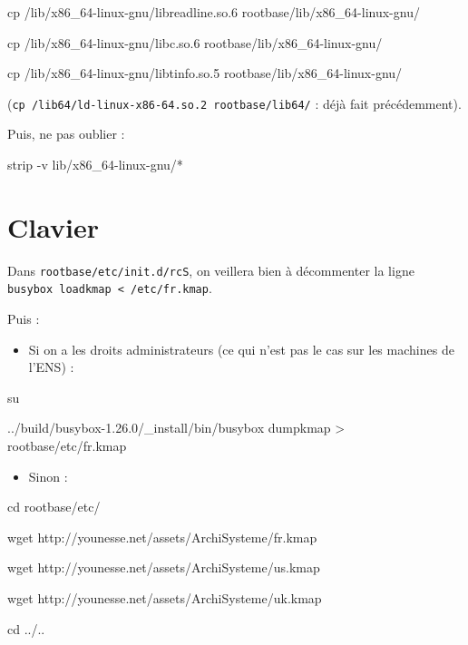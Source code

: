 \documentclass[]{article}
\newenvironment{Shaded}{}{}
\newcommand{\FunctionTok}[1]{\textcolor[rgb]{0.02,0.16,0.49}{{#1}}}
\newcommand{\OperatorTok}[1]{\textcolor[rgb]{0.40,0.40,0.40}{{#1}}}
\newcommand{\BuiltInTok}[1]{{#1}}
\newcommand{\ExtensionTok}[1]{{#1}}
\newcommand{\NormalTok}[1]{{#1}}
\providecommand{\tightlist}{%
  \setlength{\itemsep}{0pt}\setlength{\parskip}{0pt}}
\begin{document}
\begin{Shaded}
\begin{Highlighting}[]
\FunctionTok{cp} \NormalTok{/lib/x86_64-linux-gnu/libreadline.so.6 rootbase/lib/x86_64-linux-gnu/}

\FunctionTok{cp} \NormalTok{/lib/x86_64-linux-gnu/libc.so.6 rootbase/lib/x86_64-linux-gnu/}

\FunctionTok{cp} \NormalTok{/lib/x86_64-linux-gnu/libtinfo.so.5 rootbase/lib/x86_64-linux-gnu/}
\end{Highlighting}
\end{Shaded}

(\texttt{cp\ /lib64/ld-linux-x86-64.so.2\ rootbase/lib64/} : déjà fait
précédemment).

Puis, ne pas oublier :

\begin{Shaded}
\begin{Highlighting}[]
\FunctionTok{strip} \NormalTok{-v lib/x86_64-linux-gnu/*}
\end{Highlighting}
\end{Shaded}

\section{Clavier}\label{clavier}

Dans \texttt{rootbase/etc/init.d/rcS}, on veillera bien à décommenter la
ligne \texttt{busybox\ loadkmap\ \textless{}\ /etc/fr.kmap}.

Puis :

\begin{itemize}
\tightlist
\item
  Si on a les droits administrateurs (ce qui n'est pas le cas sur les
  machines de l'ENS) :
\end{itemize}

\begin{Shaded}
\begin{Highlighting}[]
\FunctionTok{su}

\ExtensionTok{../build/busybox-1.26.0/_install/bin/busybox} \NormalTok{dumpkmap }\OperatorTok{>} \NormalTok{rootbase/etc/fr.kmap}
\end{Highlighting}
\end{Shaded}

\begin{itemize}
\tightlist
\item
  Sinon :
\end{itemize}

\begin{Shaded}
\begin{Highlighting}[]
\BuiltInTok{cd} \NormalTok{rootbase/etc/}

\FunctionTok{wget} \NormalTok{http://younesse.net/assets/ArchiSysteme/fr.kmap}

\FunctionTok{wget} \NormalTok{http://younesse.net/assets/ArchiSysteme/us.kmap}

\FunctionTok{wget} \NormalTok{http://younesse.net/assets/ArchiSysteme/uk.kmap}

\BuiltInTok{cd} \NormalTok{../..}
\end{Highlighting}
\end{Shaded}
\end{document}
